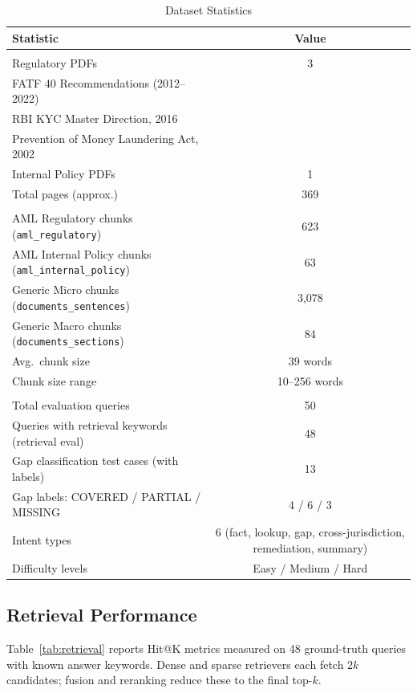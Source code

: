 \documentclass[conference, a4paper]{IEEEtran}
\begin{document}
\begin{table}[htbp]
\centering
\caption{Dataset Statistics}
\label{tab:dataset}
\begin{tabularx}{\columnwidth}{>{\raggedright\arraybackslash}X c}
\toprule
\textbf{Statistic} & \textbf{Value} \\
\midrule
\multicolumn{2}{l}{\textit{Document Corpus}} \\
Regulatory PDFs & 3 \\
\quad FATF 40 Recommendations (2012--2022) & \\
\quad RBI KYC Master Direction, 2016 & \\
\quad Prevention of Money Laundering Act, 2002 & \\
Internal Policy PDFs & 1 \\
Total pages (approx.) & 369 \\
\midrule
\multicolumn{2}{l}{\textit{Indexed Chunks}} \\
AML Regulatory chunks (\texttt{aml\_regulatory}) & 623 \\
AML Internal Policy chunks (\texttt{aml\_internal\_policy}) & 63 \\
Generic Micro chunks (\texttt{documents\_sentences}) & 3,078 \\
Generic Macro chunks (\texttt{documents\_sections}) & 84 \\
Avg.\ chunk size & 39 words \\
Chunk size range & 10--256 words \\
\midrule
\multicolumn{2}{l}{\textit{Ground Truth}} \\
Total evaluation queries & 50 \\
Queries with retrieval keywords (retrieval eval) & 48 \\
Gap classification test cases (with labels) & 13 \\
Gap labels: COVERED / PARTIAL / MISSING & 4 / 6 / 3 \\
Intent types & 6 (fact, lookup, gap, cross-jurisdiction, remediation, summary) \\
Difficulty levels & Easy / Medium / Hard \\
\bottomrule
\end{tabularx}
\end{table}

\subsection{Retrieval Performance}

Table~\ref{tab:retrieval} reports Hit@K metrics measured on 48 ground-truth queries with known
answer keywords. Dense and sparse retrievers each fetch $2k$ candidates; fusion and reranking
reduce these to the final top-$k$.
\end{document}
